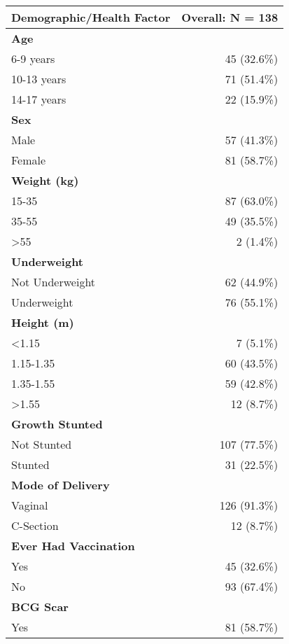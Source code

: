 \documentclass[4pt,letterpaper]{article}
\begin{document}

\begin{multicols}{2}

\begin{center}
\begin{tabular}{p{5cm}r}
\toprule
\textbf{Demographic/Health Factor} & \textbf{Overall: N = 138} \\
\midrule
\textbf{Age} & \\
6-9 years & 45 (32.6\%) \\
10-13 years & 71 (51.4\%) \\
14-17 years & 22 (15.9\%) \\
\midrule
\textbf{Sex} & \\
Male & 57 (41.3\%) \\
Female & 81 (58.7\%) \\
\midrule
\textbf{Weight (kg)} & \\
15-35 & 87 (63.0\%) \\
35-55 & 49 (35.5\%) \\
\textgreater 55 & 2 (1.4\%) \\
\midrule
\textbf{Underweight} & \\
Not Underweight & 62 (44.9\%) \\
Underweight & 76 (55.1\%) \\
\midrule
\textbf{Height (m)} & \\
\textless 1.15 & 7 (5.1\%) \\
1.15-1.35 & 60 (43.5\%) \\
1.35-1.55 & 59 (42.8\%) \\
\textgreater 1.55 & 12 (8.7\%) \\
\midrule
\textbf{Growth Stunted} & \\
Not Stunted & 107 (77.5\%) \\
Stunted & 31 (22.5\%) \\
\midrule
\textbf{Mode of Delivery} & \\
Vaginal & 126 (91.3\%) \\
C-Section & 12 (8.7\%) \\
\midrule
\textbf{Ever Had Vaccination} & \\
Yes & 45 (32.6\%) \\
No & 93 (67.4\%) \\
\midrule
\textbf{BCG Scar} & \\
Yes & 81 (58.7\%) \\

\end{tabular}
\end{center}
\end{multicols}
\end{document}
